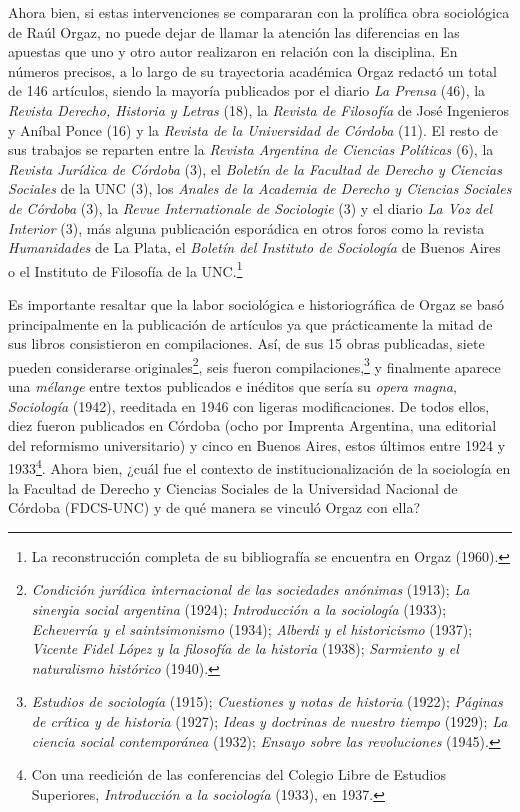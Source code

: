 Ahora bien, si estas intervenciones se compararan con la prolífica obra sociológica de Raúl Orgaz, no puede dejar de llamar la atención las diferencias en las apuestas que uno y otro autor realizaron en relación con la disciplina. En números precisos, a lo largo de su trayectoria académica Orgaz redactó un total de 146 artículos, siendo la mayoría publicados por el diario \emph{La Prensa} (46), la \emph{Revista Derecho, Historia y Letras} (18), la \emph{Revista de Filosofía} de José Ingenieros y Aníbal Ponce (16) y la \emph{Revista de la Universidad de Córdoba} (11). El resto de sus trabajos se reparten entre la \emph{Revista Argentina de Ciencias Políticas} (6), la \emph{Revista Jurídica de Córdoba} (3), el \emph{Boletín de la Facultad de Derecho y Ciencias Sociales} de la UNC (3), los \emph{Anales de la Academia de Derecho y Ciencias Sociales de Córdoba} (3), la \emph{Revue Internationale de Sociologie} (3) y el diario \emph{La Voz del Interior} (3), más alguna publicación esporádica en otros foros como la revista \emph{Humanidades} de La Plata, el \emph{Boletín del Instituto de Sociología} de Buenos Aires o el Instituto de Filosofía de la UNC.\footnote{La reconstrucción completa de su bibliografía se encuentra en Orgaz (1960).}

Es importante resaltar que la labor sociológica e historiográfica de Orgaz se basó principalmente en la publicación de artículos ya que prácticamente la mitad de sus libros consistieron en compilaciones. Así, de sus 15 obras publicadas, siete pueden considerarse originales\footnote{\emph{Condición jurídica internacional de las sociedades anónimas} (1913); \emph{La sinergia social argentina} (1924); \emph{Introducción a la sociología} (1933); \emph{Echeverría y el saintsimonismo} (1934); \emph{Alberdi y el historicismo} (1937); \emph{Vicente Fidel López y la filosofía de la historia} (1938); \emph{Sarmiento y el naturalismo histórico} (1940).}, seis fueron compilaciones,\footnote{\emph{Estudios de sociología} (1915); \emph{Cuestiones y notas de historia} (1922); \emph{Páginas de crítica y de historia} (1927); \emph{Ideas y doctrinas de nuestro tiempo} (1929); \emph{La ciencia social contemporánea} (1932); \emph{Ensayo sobre las revoluciones} (1945).} y finalmente aparece una \emph{mélange} entre textos publicados e inéditos que sería su \emph{opera magna}, \emph{Sociología} (1942), reeditada en 1946 con ligeras modificaciones. De todos ellos, diez fueron publicados en Córdoba (ocho por Imprenta Argentina, una editorial del reformismo universitario) y cinco en Buenos Aires, estos últimos entre 1924 y 1933\footnote{Con una reedición de las conferencias del Colegio Libre de Estudios Superiores, \emph{Introducción a la sociología} (1933), en 1937.}. Ahora bien, ¿cuál fue el contexto de institucionalización de la sociología en la Facultad de Derecho y Ciencias Sociales de la Universidad Nacional de Córdoba (FDCS-UNC) y de qué manera se vinculó Orgaz con ella?

